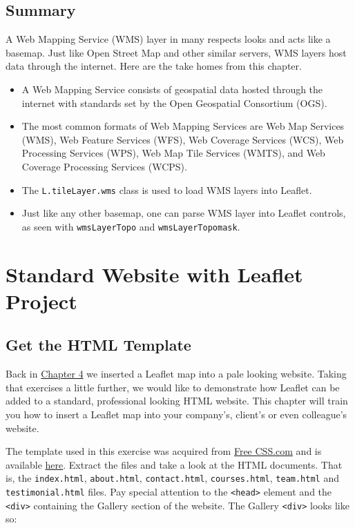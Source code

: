 \documentclass[
]{book}
\begin{document}
\hypertarget{summary-10}{%
\section{Summary}\label{summary-10}}

A Web Mapping Service (WMS) layer in many respects looks and acts like a basemap. Just like Open Street Map and other similar servers, WMS layers host data through the internet. Here are the take homes from this chapter.

\begin{itemize}
\item
  A Web Mapping Service consists of geospatial data hosted through the internet with standards set by the Open Geospatial Consortium (OGS).
\item
  The most common formats of Web Mapping Services are Web Map Services (WMS), Web Feature Services (WFS), Web Coverage Services (WCS), Web Processing Services (WPS), Web Map Tile Services (WMTS), and Web Coverage Processing Services (WCPS).
\item
  The \texttt{L.tileLayer.wms} class is used to load WMS layers into Leaflet.
\item
  Just like any other basemap, one can parse WMS layer into Leaflet controls, as seen with \texttt{wmsLayerTopo} and \texttt{wmsLayerTopomask}.
\end{itemize}

\hypertarget{standard-website-with-leaflet-project}{%
\chapter{Standard Website with Leaflet Project}\label{standard-website-with-leaflet-project}}

\hypertarget{get-the-html-template}{%
\section{Get the HTML Template}\label{get-the-html-template}}

Back in \protect\hyperlink{embedding-leaflet-map-to-an-external-website}{Chapter 4} we inserted a Leaflet map into a pale looking website. Taking that exercises a little further, we would like to demonstrate how Leaflet can be added to a standard, professional looking HTML website. This chapter will train you how to insert a Leaflet map into your company's, client's or even colleague's website.

The template used in this exercise was acquired from \href{https://www.free-css.com/free-css-templates}{Free CSS.com} and is available \href{https://www.free-css.com/assets/files/free-css-templates/download/page291/elearning.zip}{here}. Extract the files and take a look at the HTML documents. That is, the \texttt{index.html}, \texttt{about.html}, \texttt{contact.html}, \texttt{courses.html}, \texttt{team.html} and \texttt{testimonial.html} files. Pay special attention to the \texttt{\textless{}head\textgreater{}} element and the \texttt{\textless{}div\textgreater{}} containing the Gallery section of the website. The Gallery \texttt{\textless{}div\textgreater{}} looks like so:
\end{document}
